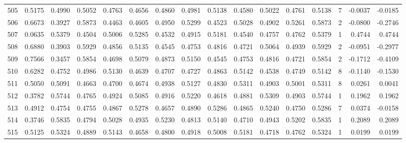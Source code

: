 \begin{tabular}{lrrrrrrrrrrrrrrr}
505 &      0.5175 &  0.4990 &  0.5052 &  0.4763 &  0.4656 &  0.4860 &  0.4981 &  0.5138 &  0.4580 &  0.5022 &   0.4761 &     0.5138 &      7 &                   -0.0037 &                    -0.0185 \\
506 &      0.6673 &  0.3927 &  0.5873 &  0.4463 &  0.4605 &  0.4950 &  0.5299 &  0.4523 &  0.5028 &  0.4902 &   0.5261 &     0.5873 &      2 &                   -0.0800 &                    -0.2746 \\
507 &      0.0635 &  0.5379 &  0.4504 &  0.5006 &  0.5285 &  0.4532 &  0.4915 &  0.5181 &  0.4540 &  0.4757 &   0.4762 &     0.5379 &      1 &                    0.4744 &                     0.4744 \\
508 &      0.6880 &  0.3903 &  0.5929 &  0.4856 &  0.5135 &  0.4545 &  0.4753 &  0.4816 &  0.4721 &  0.5064 &   0.4939 &     0.5929 &      2 &                   -0.0951 &                    -0.2977 \\
509 &      0.7566 &  0.3457 &  0.5854 &  0.4698 &  0.5079 &  0.4873 &  0.5150 &  0.4545 &  0.4753 &  0.4816 &   0.4721 &     0.5854 &      2 &                   -0.1712 &                    -0.4109 \\
510 &      0.6282 &  0.4752 &  0.4986 &  0.5130 &  0.4639 &  0.4707 &  0.4727 &  0.4863 &  0.5142 &  0.4538 &   0.4749 &     0.5142 &      8 &                   -0.1140 &                    -0.1530 \\
511 &      0.5050 &  0.5091 &  0.4663 &  0.4700 &  0.4674 &  0.4938 &  0.5127 &  0.4830 &  0.5311 &  0.4903 &   0.5001 &     0.5311 &      8 &                    0.0261 &                     0.0041 \\
512 &      0.3782 &  0.5744 &  0.4765 &  0.4924 &  0.5085 &  0.4916 &  0.5220 &  0.4618 &  0.4881 &  0.5309 &   0.4903 &     0.5744 &      1 &                    0.1962 &                     0.1962 \\
513 &      0.4912 &  0.4754 &  0.4755 &  0.4867 &  0.5278 &  0.4657 &  0.4890 &  0.5286 &  0.4865 &  0.5240 &   0.4750 &     0.5286 &      7 &                    0.0374 &                    -0.0158 \\
514 &      0.3746 &  0.5835 &  0.4794 &  0.5028 &  0.4935 &  0.5230 &  0.4813 &  0.5140 &  0.4710 &  0.4943 &   0.5202 &     0.5835 &      1 &                    0.2089 &                     0.2089 \\
515 &      0.5125 &  0.5324 &  0.4889 &  0.5143 &  0.4658 &  0.4800 &  0.4918 &  0.5008 &  0.5181 &  0.4718 &   0.4762 &     0.5324 &      1 &                    0.0199 &                     0.0199 \\

\end{tabular}

